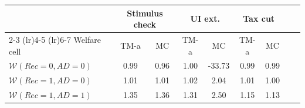 \begin{tabular}{@{}lcccccccc@{}}
\toprule
& \multicolumn{2}{c}{Stimulus check} & \multicolumn{2}{c}{UI ext.} & \multicolumn{2}{c}{Tax cut} \\
\cmidrule(lr){2-3} \cmidrule(lr){4-5} \cmidrule(lr){6-7}
Welfare cell & TM-a & MC & TM-a & MC & TM-a & MC \\ \midrule
$\mathcal{W}(Rec=0, AD=0)$ & 0.99 & 0.96 & 1.00 & -33.73 & 0.99 & 0.99 \\
$\mathcal{W}(Rec=1, AD=0)$ & 1.01 & 1.01 & 1.02 & 2.04 & 1.01 & 1.00 \\
$\mathcal{W}(Rec=1, AD=1)$ & 1.35 & 1.36 & 1.31 & 2.50 & 1.15 & 1.13 \\ \bottomrule
\end{tabular}
